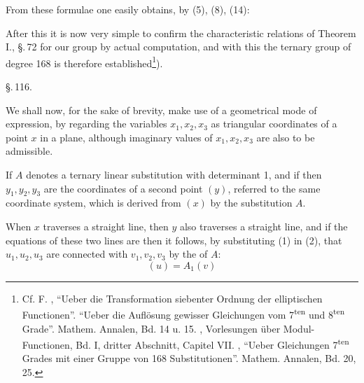 From these formulae one easily obtains, by (5), (8), (14):

After this it is now very simple to confirm the characteristic relations of Theorem I., \S.\,72 for our group by actual computation, and with this the ternary group of degree 168 is therefore established\footnote{Cf. F. , ``Ueber die Transformation siebenter Ordnung der elliptischen Functionen''. ``Ueber die Auflösung gewisser Gleichungen vom 7\textsuperscript{ten} und 8\textsuperscript{ten} Grade''. Mathem. Annalen, Bd. 14 u. 15. , Vorlesungen über Modul-Functionen, Bd. I, dritter Abschnitt, Capitel VII. , ``Ueber Gleichungen 7\textsuperscript{ten} Grades mit einer Gruppe von 168 Substitutionen''. Mathem. Annalen, Bd. 20, 25.}).

\begin{center}
\S.\,116.\\[2pt]
\end{center}

We shall now, for the sake of brevity, make use of a geometrical mode of expression, by regarding the variables $x_1, x_2, x_3$ as triangular coordinates of a point $x$ in a plane, although imaginary values of $x_1, x_2, x_3$ are also to be admissible.

If $A$ denotes a ternary linear substitution with determinant 1, and if
then $y_1, y_2, y_3$ are the coordinates of a second point $(y)$, referred to the same coordinate system, which is derived from $(x)$ by the substitution $A$.

When $x$ traverses a straight line, then $y$ also traverses a straight line, and if the equations of these two lines are
then it follows, by substituting (1) in (2), that $u_1, u_2, u_3$ are connected with $v_1, v_2, v_3$ by the  of $A$:
\[ (u) = A_1(v) \]

